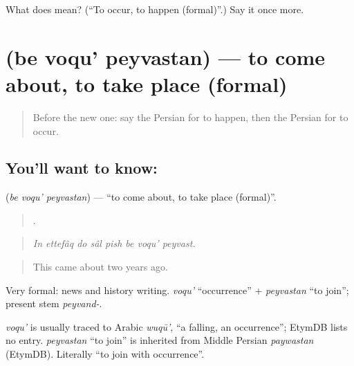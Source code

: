 \begin{tcolorbox}[breakable,colback=teal!4,colframe=teal!35!black,title={Before you move on}]
What does   mean? (\textquotedblleft{}To occur, to happen (formal)\textquotedblright{}.) Say it once more.
\end{tcolorbox}
\section[\texorpdfstring{\fa{به} \fa{وقوع} \fa{پیوستن} (be voqu' peyvastan)}{به وقوع پیوستن (be voqu' peyvastan)}]{   (be voqu' peyvastan) — to come about, to take place (formal)}

\label{lesson:FA-C301-be-voqu-peyvastan}



\begin{quote}
Before the new one: say the Persian for to happen, then the Persian for to occur.
\end{quote}

\subsection*{You'll want to know:   }
\textbf{  } (\emph{be voqu' peyvastan}) — \textquotedblleft{}to come about, to take place (formal)\textquotedblright{}.

\begin{quote}
       .
\end{quote}

\begin{quote}
\emph{In ettefâq do sâl pish be voqu' peyvast.}
\end{quote}

\begin{quote}
This came about two years ago.
\end{quote}

Very formal: news and history writing. \emph{voqu'} \textquotedblleft{}occurrence\textquotedblright{} + \emph{peyvastan} \textquotedblleft{}to join\textquotedblright{}; present stem \emph{peyvand-}.

\begin{cousinweb}
\emph{voqu'} is usually traced to Arabic \emph{wuqū'}, \textquotedblleft{}a falling, an occurrence\textquotedblright{}; EtymDB lists no entry. \emph{peyvastan} \textquotedblleft{}to join\textquotedblright{} is inherited from Middle Persian \emph{paywastan} (EtymDB). Literally \textquotedblleft{}to join with occurrence\textquotedblright{}.
\end{cousinweb}

